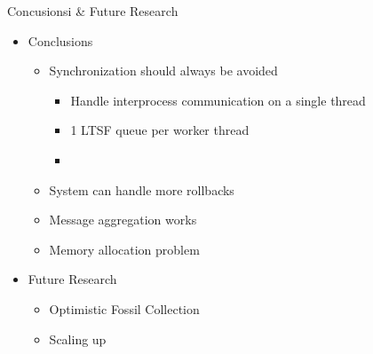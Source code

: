 \documentclass[10pt]{beamer}
\begin{document}
\begin{frame}{Concusionsi \& Future Research}
    \begin{itemize}
        \item Conclusions
            \begin{itemize}
                \item Synchronization should always be avoided
                    \begin{itemize}
                        \item Handle interprocess communication on a single thread
                        \item 1 LTSF queue per worker thread
                        \item 
                    \end{itemize}
                \item System can handle more rollbacks 
                \item Message aggregation works                    
                \item Memory allocation problem
            \end{itemize}
        \item Future Research
            \begin{itemize}
                \item Optimistic Fossil Collection
                \item Scaling up
            \end{itemize}
    \end{itemize}
\end{frame}
\end{document}
